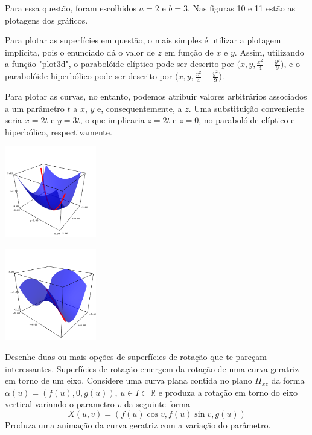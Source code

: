 \documentclass[../main.tex]{subfiles}
\begin{document}
		\begin{solucao}
			Para essa questão, foram escolhidos $a=2$ e $b=3$. Nas figuras 10 e 11 estão as plotagens dos gráficos.
			
			Para plotar as superfícies em questão, o mais simples é utilizar a plotagem implícita, pois o enunciado dá o valor de $z$ em função de $x$ e $y$. Assim, utilizando a função "plot3d", o parabolóide elíptico pode ser descrito por $\big(x,y,\tfrac{x^2}{4}+\tfrac{y^2}{9}\big)$, e o parabolóide hiperbólico pode ser descrito por $\big(x,y,\tfrac{x^2}{4}-\tfrac{y^2}{9}\big)$.
			
			Para plotar as curvas, no entanto, podemos atribuir valores arbitrários associados a um parâmetro $t$ a $x$, $y$ e, consequentemente, a $z$. Uma substituição conveniente seria $x=2t$ e $y=3t$, o que implicaria $z=2t$ e $z=0$, no parabolóide elíptico e hiperbólico, respectivamente. 
			
			
			\begin{center}
				\includegraphics[width=0.3\textwidth]{imagens/lista03/picture_lista03_q02_item01.png}
			\end{center}
			
			\begin{center}
				\includegraphics[width=0.3\textwidth]{imagens/lista03/picture_lista03_q02_item02.png}
			\end{center}
			
			\vspace{\baselineskip}
		\end{solucao}
		
		
		\begin{exercicio}{3}
			Desenhe duas ou mais opções de superfícies de rotação que te pareçam interessantes. Superfícies de rotação emergem da rotação de uma curva geratriz em torno de um eixo. Considere uma curva plana contida no plano $\Pi_{xz}$ da forma $\alpha(u) = (f(u), 0, g(u))$, $u \in I \subset \mathbb{R}$ e produza a rotação em torno do eixo vertical variando o parametro $v$ da seguinte forma
			\[
			X(u, v) = (f(u) \cos{v}, f(u)\sin{v}, g(u))
			\]
			Produza uma animação da curva geratriz com a variação do parâmetro.
		\end{exercicio}
		
\end{document}

